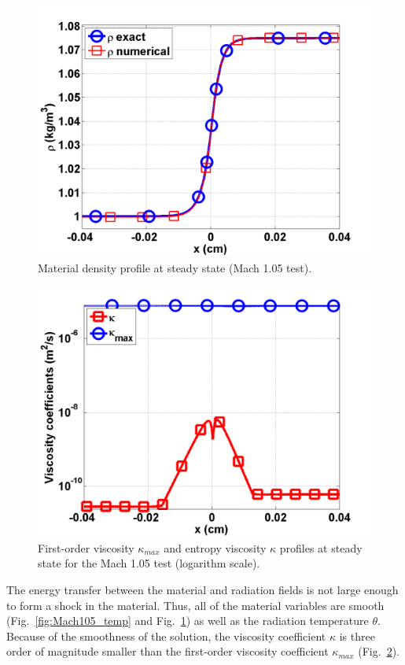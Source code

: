 \documentclass[review]{elsarticle}
\newcommand{\fig}[1]{Fig.~\ref{#1}}                      %
\begin{document}
\begin{figure}[H]
                \centering
                \includegraphics[width=\textwidth]{figs/Mach_1p05_nel_500_density}
        \caption{Material density profile at steady state (Mach 1.05 test).}\label{fig:Mach105_density}
\end{figure}
\begin{figure}[H]
                \centering
                \includegraphics[width=\textwidth]{figs/Mach_1p05_nel_500_viscosity.png}
        \caption{First-order viscosity $\kappa_{max}$ and entropy viscosity $\kappa$ profiles at steady state for the Mach 1.05 test (logarithm scale).}\label{fig:Mach105_viscosity}
\end{figure}
The energy transfer between the material and radiation fields is not large enough to form a shock in the material. Thus, all of the material variables are smooth (\fig{fig:Mach105_temp} and \fig{fig:Mach105_density}) as well as the radiation temperature $\theta$. Because of the smoothness of the solution, the viscosity coefficient $\kappa$ is three order of magnitude smaller than the first-order viscosity coefficient $\kappa_{max}$ (\fig{fig:Mach105_viscosity}).
\end{document}
